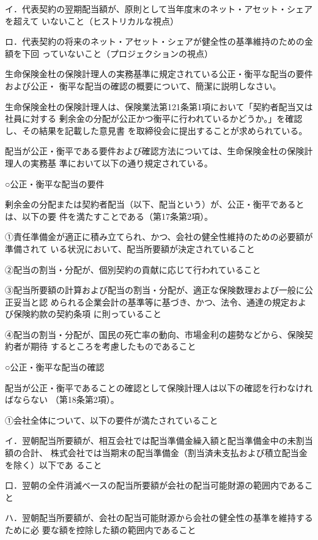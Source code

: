 \documentclass[report,gutter=10mm,fore-edge=10mm,uplatex,dvipdfmx]{jlreq}
\begin{document}
イ．代表契約の翌期配当額が、原則として当年度末のネット・アセット・シェアを超えて
いないこと（ヒストリカルな視点）

ロ．代表契約の将来のネット・アセット・シェアが健全性の基準維持のための金額を下回
っていないこと（プロジェクションの視点）

生命保険金杜の保険計理人の実務基準に規定されている公正・衡平な配当の要件および公正・
衡平な配当の確認の概要について、簡潔に説明しなさい。

\answer{}
生命保険金杜の保険計理人は、保険業法第121条第1項において「契約者配当又は社員に対する
剰余金の分配が公正かつ衡平に行われているかどうか。」を確認し、その結果を記載した意見書
を取締役会に提出することが求められている。

配当が公正・衡平である要件および確認方法については、生命保険金杜の保険計理人の実務基
準において以下の通り規定されている。

○公正・衡平な配当の要件

剰余金の分配または契約者配当（以下、配当という）が、公正・衡平であるとは、以下の要
件を満たすことである（第17条第2項）。

①責任準備金が適正に積み立てられ、かつ、会社の健全性維持のための必要額が準備されて
いる状況において、配当所要額が決定されていること

②配当の割当・分配が、個別契約の貢献に応じて行われていること

③配当所要額の計算および配当の割当・分配が、適正な保険数理および一般に公正妥当と認
められる企業会計の基準等に基づき、かつ、法令、通達の規定および保険約款の契約条項
に則っていること

④配当の割当・分配が、国民の死亡率の動向、市場金利の趨勢などから、保険契約者が期待
するところを考慮したものであること

○公正・衡平な配当の確認

配当が公正・衡平であることの確認として保険計理人は以下の確認を行わなければならない
（第18条第2項）。

①会社全体について、以下の要件が満たされていること

イ．翌朝配当所要額が、相互会社では配当準備金繰入額と配当準備金中の未割当額の合計、
株式会社では当期末の配当準備金（割当済未支払および積立配当金を除く）以下であ
ること

口．翌朝の全件消滅べ一スの配当所要額が会社の配当可能財源の範囲内であること

ハ．翌朝配当所要額が、会社の配当可能財源から会社の健全性の基準を維持するために必
要な額を控除した額の範囲内であること
\end{document}

